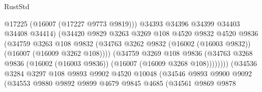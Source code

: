 \begin{lexlean}{RustStd}
\begin{coremodule}
                                        @17225
                                        (@16007 (@17227 @9773 @9819)))
                                      @34393
                                      @34396
                                      @34399
                                      @34403
                                      @34408
                                      @34414)
                                    (@34420
                                      @9829
                                      @3263
                                      @3269
                                      @108
                                      @4520
                                      @9832
                                      @4520
                                      @9836
                                      (@34759
                                        @3263
                                        @108
                                        @9832
                                        (@34763
                                          @3262
                                          @9832
                                          (@16002 (@16003 @9832))
                                          (@16007 (@16009 @3262 @108))))
                                      (@34759
                                        @3269
                                        @108
                                        @9836
                                        (@34763
                                          @3268
                                          @9836
                                          (@16002 (@16003 @9836))
                                          (@16007 (@16009 @3268 @108))))))))
                              (@34536
                                @3284
                                @3297
                                @108
                                @9893
                                @9902
                                @4520
                                @10048
                                (@34546
                                  @9893
                                  @9900
                                  @9092
                                  (@34553
                                    @9880
                                    @9892
                                    @9899
                                    @4679
                                    @9845
                                    @4685
                                    (@34561
                                      @9869
                                      @9878

\end{coremodule}
\end{lexlean}
